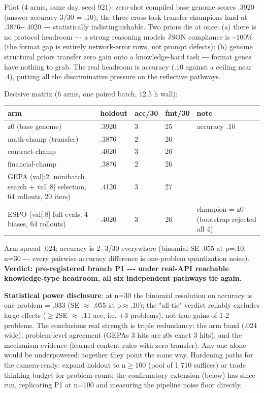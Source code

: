 Pilot (4 arms, same day, seed 921): zero-shot compiled base genome scores .3920 (answer accuracy 3/30 = .10); the three cross-task transfer champions land at .3876-\/-.4020 -\/-\/- statistically indistinguishable. Two priors die at once: (a) there is no protocol headroom -\/-\/- a strong reasoning model\textquotesingle s JSON compliance is \textasciitilde100\% (the format gap is entirely network-error rows, not prompt defects); (b) genome structural priors transfer zero gain onto a knowledge-hard task -\/-\/- format genes have nothing to grab. The real headroom is accuracy (.10 against a ceiling near .4), putting all the discriminative pressure on the reflective pathways.

Decisive matrix (6 arms, one paired batch, 12.5 h wall):

\begin{longtable}[]{@{}lllll@{}}
\toprule\noalign{}
arm & holdout & acc/30 & fmt/30 & note \\
\midrule\noalign{}
\endhead
\bottomrule\noalign{}
\endlastfoot
z0 (base genome) & .3920 & 3 & 25 & accuracy .10 \\
math-champ (transfer) & .3876 & 2 & 26 & \\
contract-champ & .4020 & 3 & 26 & \\
financial-champ & .3876 & 2 & 26 & \\
GEPA (val{[}:2{]} minibatch search + val{[}:8{]} selection, 64 rollouts, 20 iters) & .4120 & 3 & 27 & \\
ESPO (val{[}:8{]} full evals, 4 biases, 64 rollouts) & .4020 & 3 & 26 & champion = z0 (bootstrap rejected all 4) \\
\end{longtable}

Arm spread .024; accuracy is 2-\/-3/30 everywhere (binomial SE .055 at p=.10, n=30 -\/-\/- every pairwise accuracy difference is one-problem quantization noise). \textbf{Verdict: pre-registered branch P1 -\/-\/- under real-API reachable knowledge-type headroom, all six independent pathways tie again.}

\textbf{Statistical power disclosure}: at n=30 the binomial resolution on accuracy is one problem = .033 (SE \(\approx\) .055 at p\(\approx\).10); the "all-tie" verdict reliably excludes large effects (\(\geq\)2SE \(\approx\) .11 acc, i.e. +3 problems), not true gains of 1-2 problems. The conclusion\textquotesingle s real strength is triple redundancy: the arm band (.024 wide), problem-level agreement (GEPA\textquotesingle s 3 hits are z0\textquotesingle s exact 3 hits), and the mechanism evidence (learned content rules with zero transfer). Any one alone would be underpowered; together they point the same way. Hardening paths for the camera-ready: expand holdout to n\(\geq\)100 (pool of 1 710 suffices) or trade thinking budget for problem count; the confirmatory extension (below) has since run, replicating P1 at n=100 and measuring the pipeline noise floor directly.

